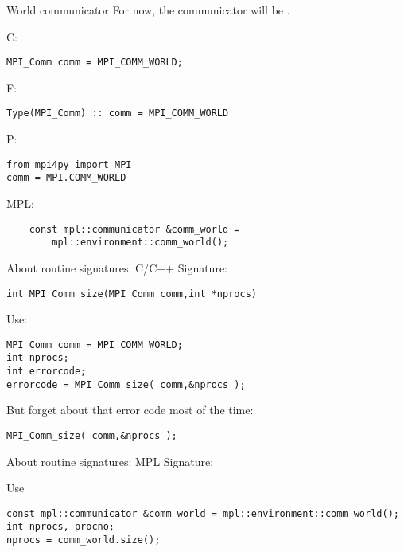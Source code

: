 \begin{numberedframe}{World communicator}
  \label{sl:mpi-comm-world}
  For now, the communicator will be .

  C:
  \lstset{language=C}
\begin{lstlisting}
MPI_Comm comm = MPI_COMM_WORLD;
\end{lstlisting}

  F:
  \lstset{language=Fortran}
\begin{lstlisting}
Type(MPI_Comm) :: comm = MPI_COMM_WORLD
\end{lstlisting}

  P:
  \lstset{language=Python}
\begin{lstlisting}
from mpi4py import MPI
comm = MPI.COMM_WORLD
\end{lstlisting}

  MPL:
  \lstset{language=C++}
\begin{lstlisting}
    const mpl::communicator &comm_world =
        mpl::environment::comm_world();
\end{lstlisting}
\end{numberedframe}


\begin{exerciseframe}[commrank]
  
\end{exerciseframe}

\begin{numberedframe}{About routine signatures: C/C++}
  \label{sec:protos}
Signature:
\lstset{language=C}
\begin{lstlisting}
int MPI_Comm_size(MPI_Comm comm,int *nprocs)
\end{lstlisting}
Use:
\lstset{language=C}
\begin{lstlisting}
MPI_Comm comm = MPI_COMM_WORLD;
int nprocs;
int errorcode;
errorcode = MPI_Comm_size( comm,&nprocs );
\end{lstlisting}
But forget about that error code most of the time:
\begin{lstlisting}
MPI_Comm_size( comm,&nprocs );
\end{lstlisting}
\end{numberedframe}

\begin{mpl}
  \addtocounter{slidecount}{-1}
\begin{numberedframe}{About routine signatures: MPL}
  Signature:
  
  Use
\begin{lstlisting}
const mpl::communicator &comm_world = mpl::environment::comm_world();
int nprocs, procno;
nprocs = comm_world.size();
\end{lstlisting}
\end{numberedframe}
\end{mpl}

